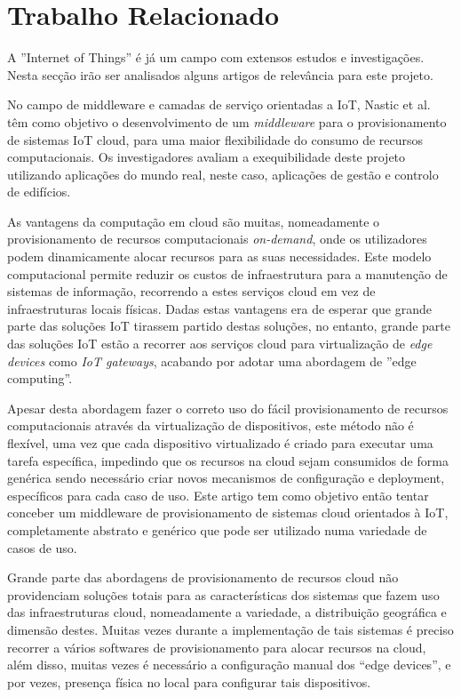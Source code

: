 \section{Trabalho Relacionado}
A ''Internet of Things'' é já um campo com extensos estudos e investigações. Nesta secção irão ser analisados alguns artigos de relevância para este projeto.


No campo de middleware e camadas de serviço orientadas a IoT, Nastic et al. \cite{iot-provision} têm como objetivo o desenvolvimento de um \textit{middleware} para o provisionamento de sistemas IoT cloud, para uma maior flexibilidade do consumo de recursos computacionais. Os investigadores avaliam a exequibilidade deste projeto utilizando aplicações do mundo real, neste caso, aplicações de gestão e controlo de edifícios.

As vantagens da computação em cloud são muitas, nomeadamente o provisionamento de recursos computacionais \textit{on-demand}, onde os utilizadores podem dinamicamente alocar recursos para as suas necessidades. Este modelo computacional permite reduzir os custos de infraestrutura para a manutenção de sistemas de informação, recorrendo a estes serviços cloud em vez de infraestruturas locais físicas. Dadas estas vantagens era de esperar que grande parte das soluções IoT tirassem partido destas soluções, no entanto, grande parte das soluções IoT estão a recorrer aos serviços cloud para virtualização de \textit{edge devices} como \textit{IoT gateways}, acabando por adotar uma abordagem de ''edge computing''. 

Apesar desta abordagem fazer o correto uso do fácil provisionamento de recursos computacionais através da virtualização de dispositivos, este método não é flexível, uma vez que cada dispositivo virtualizado é criado para executar uma tarefa específica, impedindo que os recursos na cloud sejam consumidos de forma genérica sendo necessário criar novos mecanismos de configuração e deployment, específicos para cada caso de uso. Este artigo tem como objetivo então tentar conceber um middleware de provisionamento de sistemas cloud orientados à IoT, completamente abstrato e genérico que pode ser utilizado numa variedade de casos de uso.

Grande parte das abordagens de provisionamento de recursos cloud não providenciam soluções totais para as características dos sistemas que fazem uso das infraestruturas cloud, nomeadamente a variedade, a distribuição geográfica e dimensão destes. Muitas vezes durante a implementação de tais sistemas é preciso recorrer a vários softwares de provisionamento para alocar recursos na cloud, além disso,  muitas vezes é necessário a configuração manual dos “edge devices”, e por vezes, presença física no local para configurar tais dispositivos.

